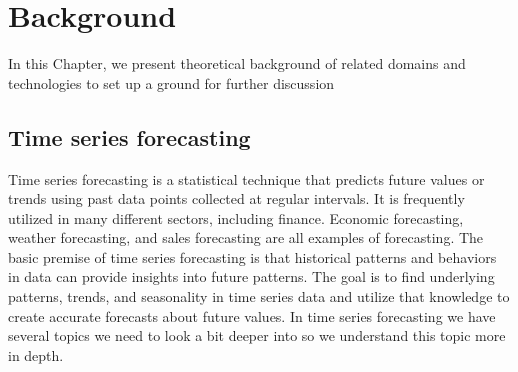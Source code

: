 \documentclass{imc-inf}
\begin{document}
\chapter{Background}\label{chap:background}

In this Chapter, we present theoretical background of related domains and technologies to set up a ground for further discussion


\section{Time series forecasting}
Time series forecasting \cite{time_ser} is a statistical technique that predicts future values or trends using past data points collected at regular intervals. It is frequently utilized in many different sectors, including finance.
Economic forecasting, weather forecasting, and sales forecasting are all examples of forecasting.
The basic premise of time series forecasting is that historical patterns and behaviors in data can provide insights into future patterns. The goal is to find underlying patterns, trends, and seasonality in time series data and utilize that knowledge to create accurate forecasts about future values.
In time series forecasting we have several topics we need to look a bit deeper into so we understand this topic more in depth.
\end{document}
